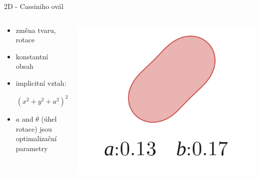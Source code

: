 \documentclass[aspectratio=169,xcolor=dvipsnames]{beamer}
\begin{document}
\begin{frame}{2D - Cassiniho ovál}
	\addtocounter{framenumber}{-1}
	\begin{columns}
		\begin{column}{.6\textwidth}
			\begin{itemize}
				\setlength\itemsep{1.4em}
				\item změna tvaru, rotace
				\item konstantní obsah
				\item implicitní vztah:
			\end{itemize}		
			\vspace{4mm}
			$$ \ \ \ \ \ \ \ \ \left( x^{2}+ y^{2}+a^{2} \right)^{2}-4 x ^{2} a^{2}-b^{4} = 0 $$
			\vspace{-3mm}
			\begin{itemize}
				\item $ a $ and $ \theta $ (úhel rotace) jsou optimalizační parametry
			\end{itemize}	
		\end{column}
		\begin{column}{.4\textwidth}
			\includegraphics[width=0.9\linewidth, trim={0 0 0 0}, clip]{Images/a2.png}			
		\end{column}
	\end{columns}	
\end{frame}
\end{document}
